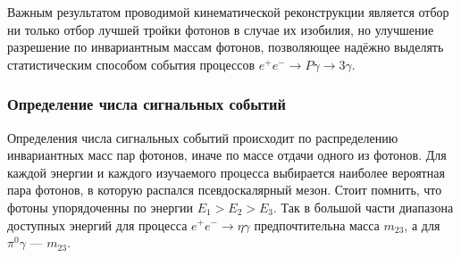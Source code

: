 Важным результатом проводимой кинематической реконструкции является отбор ни только отбор лучшей тройки фотонов в случае их изобилия,
но улучшение разрешение по инвариантным массам фотонов,
позволяющее надёжно выделять статистическим способом события процессов $e^+ e^- \to P \gamma \to 3 \gamma$.


\subsubsection{Определение числа сигнальных событий}

Определения числа сигнальных событий происходит по распределению инвариантных масс пар фотонов,
иначе по массе отдачи одного из фотонов.
Для каждой энергии и каждого  изучаемого процесса выбирается наиболее вероятная пара фотонов,
в которую распался псевдоскалярный мезон.
Стоит помнить, что фотоны упорядоченны по энергии $E_1 > E_2 > E_3$.
Так в большой части диапазона доступных энергий для процесса $e^+ e^- \to \eta \gamma$ предпочтительна масса $m_{23}$,
а для $\pi^0 \gamma$ --- $m_{23}$.

